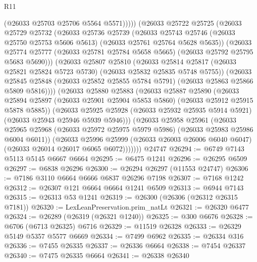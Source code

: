 \begin{lexlean}{R11}
\begin{coremodule}
                (@26033 @25703 @25706 @5564 @5571)))))
        (@26033
          @25722
          @25725
          (@26033
            @25729
            @25732
            (@26033
              @25736
              @25739
              (@26033
                @25743
                @25746
                (@26033 @25750 @25753 @5606 @5613)
                (@26033 @25761 @25764 @5628 @5635))
              (@26033
                @25774
                @25777
                (@26033 @25781 @25784 @5658 @5665)
                (@26033 @25792 @25795 @5683 @5690)))
            (@26033
              @25807
              @25810
              (@26033
                @25814
                @25817
                (@26033 @25821 @25824 @5723 @5730)
                (@26033 @25832 @25835 @5748 @5755))
              (@26033
                @25845
                @25848
                (@26033 @25852 @25855 @5784 @5791)
                (@26033 @25863 @25866 @5809 @5816))))
          (@26033
            @25880
            @25883
            (@26033
              @25887
              @25890
              (@26033
                @25894
                @25897
                (@26033 @25901 @25904 @5853 @5860)
                (@26033 @25912 @25915 @5878 @5885))
              (@26033
                @25925
                @25928
                (@26033 @25932 @25935 @5914 @5921)
                (@26033 @25943 @25946 @5939 @5946)))
            (@26033
              @25958
              @25961
              (@26033
                @25965
                @25968
                (@26033 @25972 @25975 @5979 @5986)
                (@26033 @25983 @25986 @6004 @6011))
              (@26033
                @25996
                @25999
                (@26033 @26003 @26006 @6040 @6047)
                (@26033 @26014 @26017 @6065 @6072)))))))
    @24747
@26294 := @6749 @7143 @5113 @5145 @6667 @6664
@26295 := @6475 @1241
@26296 := @26295 @6509
@26297 := @6838 @26296
@26300 := @26294 @26297 (@11553 @24747)
@26306 := @7186 @3110 @6664 @6666 @6837 @26296 @7198
@26307 := @7168 @1242
@26312 := @26307 @121 @6664 @6664 @1241 @6509
@26313 := @6944 @7143
@26315 := @26313 @53 @1241
@26319 := @26300 (@26306 (@26312 @26315 @7181))
@26320 := LexLeanPreservation.prim_natLt
@26321 := @26320 @6477
@26324 := @26289 (@26319 (@26321 @1240))
@26325 := @300 @6676
@26328 := @6706 (@6713 @26325) @6716
@26329 := @11519 @26328
@26333 := @26329 @5149 @5357 @5577 @6669
@26334 := @7499 @6962
@26335 := @26334 @316
@26336 := @7455 @26335
@26337 := @26336 @6664
@26338 := @7454 @26337
@26340 := @7475 @26335 @6664
@26341 := @26338 @26340

\end{coremodule}
\end{lexlean}
